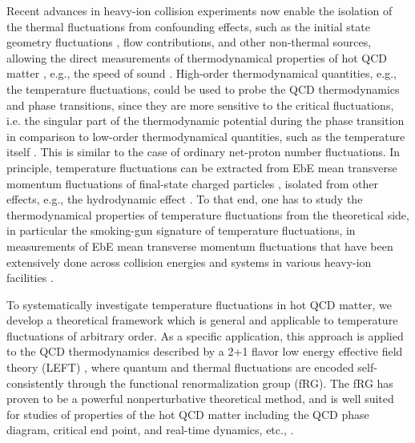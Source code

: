 \documentclass[aps,twocolumn,
prl,
superscriptaddress,nofootinbib,floatfix]{revtex4-2}
\begin{document}
Recent advances in heavy-ion collision experiments now enable the isolation of the thermal fluctuations from confounding effects, such as the initial state geometry fluctuations \cite{Gardim:2011xv, Schenke:2014tga, STAR:2024wgy, ATLAS:2024jvf, Zhang:2025yyd}, flow contributions, and other non-thermal sources, allowing the direct measurements of thermodynamical properties of hot QCD matter \cite{Gardim:2019xjs}, e.g., the speed of sound \cite{Gardim:2019brr, Gardim:2024zvi, CMS:2024sgx, Mu:2025gtr}. High-order thermodynamical quantities, e.g., the temperature fluctuations, could be used to probe the QCD thermodynamics and phase transitions, since they are more sensitive to the critical fluctuations, i.e. the singular part of the thermodynamic potential during the phase transition in comparison to low-order thermodynamical quantities, such as the temperature itself \cite{NA60:2008dcb, HADES:2019auv, Churchill:2023zkk, STAR:2024bpc}. This is similar to the case of ordinary net-proton number fluctuations. In principle, temperature fluctuations can be extracted from EbE mean transverse momentum fluctuations of final-state charged particles \cite{Gavin:2003cb}, isolated from other effects, e.g., the hydrodynamic effect \cite{Giacalone:2020lbm}. To that end, one has to study the thermodynamical properties of temperature fluctuations from the theoretical side, in particular the smoking-gun signature of temperature fluctuations, in measurements of EbE mean transverse momentum fluctuations that have been extensively done across collision energies and systems in various heavy-ion facilities \cite{NA49:1999inh, CERES:2003sap, PHENIX:2003ccl, STAR:2005vxr, NA49:2008fag, ALICE:2023tej, ATLAS:2024jvf}. 
 
To systematically investigate temperature fluctuations in hot QCD matter, we develop a theoretical framework which is general and applicable to temperature fluctuations of arbitrary order. As a specific application, this approach is applied to the QCD thermodynamics described by a 2+1 flavor low energy effective field theory (LEFT) \cite{Wen:2018nkn}, where quantum and thermal fluctuations are encoded self-consistently through the functional renormalization group (fRG). The fRG has proven to be a powerful nonperturbative theoretical method, and is well suited for  studies of properties of the hot QCD matter including the QCD phase diagram, critical end point, and real-time dynamics, etc., \cite{Fu:2019hdw, Braun:2020ada, Braun:2023qak, Tan:2024fuq, Fu:2024rto, Dupuis:2020fhh, Fu:2022gou}.
\end{document}
